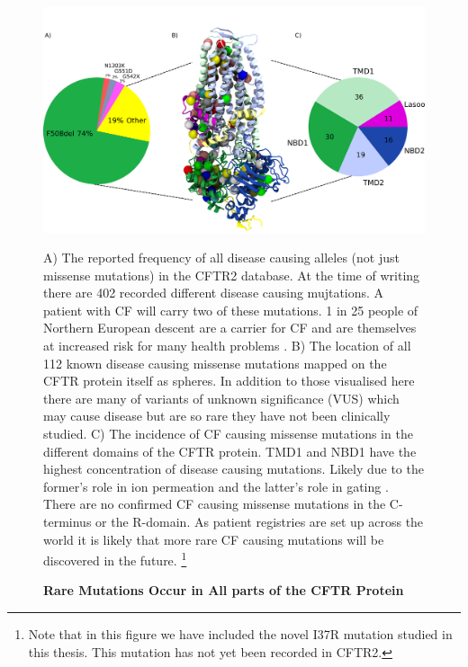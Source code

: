 \begin{figure}
	\begin{center}
	\includegraphics[width=\textwidth]{figures/alleles_pie_chart.pdf}
	\end{center}
	\captionsetup{singlelinecheck = false, justification=raggedright}
	\caption[Rare Mutations Occur in Across the CFTR Protein] {\textbf{Rare Mutations Occur in All parts of the CFTR Protein}}{A) The reported frequency of all disease causing alleles (not just missense mutations) in the CFTR2 database. At the time of writing there are 402 recorded different disease causing mujtations. A patient with CF will carry two of these mutations. 1 in 25 people of Northern European descent are a carrier for CF and are themselves at increased risk for many health problems \cite{ioannou2014, miller2020}. B) The location of all 112 known disease causing missense mutations mapped on the CFTR protein itself as spheres. In addition to those visualised here there are many of variants of unknown significance (VUS) which may cause disease but are so rare they have not been clinically studied. C) The incidence of CF causing missense mutations in the different domains of the CFTR protein. TMD1 and NBD1 have the highest concentration of disease causing mutations. Likely due to the former's role in ion permeation and the latter's role in gating \cite{cftr2}}. There are no confirmed CF causing missense mutations in the C-terminus or the R-domain. As patient registries are set up across the world it is likely that more rare CF causing mutations will be discovered in the future. \footnote{Note that in this figure we have included the novel I37R mutation studied in this thesis. This mutation has not yet been recorded in CFTR2.} 
	\label{CFTR_mutations_pie_chart}
\end{figure}


